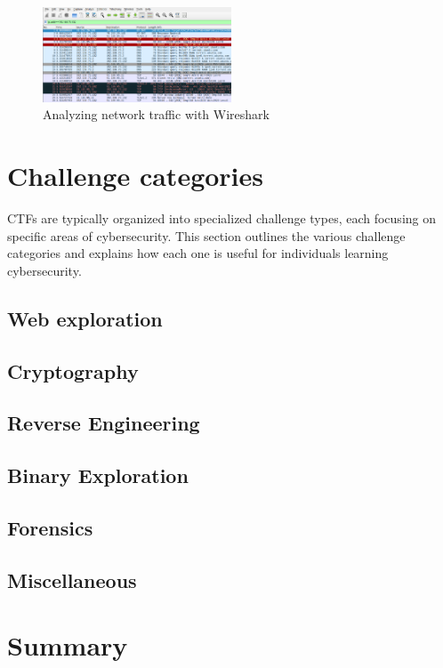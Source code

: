 \documentclass[conference]{IEEEtran}
\begin{document}
\begin{figure}[htbp]
	\centering
	\includegraphics[width=0.5\textwidth]{fig/wireshark.png}
	\caption{Analyzing network traffic with Wireshark}
	\label{fig-gdb}
\end{figure}

\section{Challenge categories}

CTFs are typically organized into specialized challenge types, each focusing on
specific areas of cybersecurity. This section outlines the various challenge
categories and explains how each one is useful for individuals learning
cybersecurity.

\subsection{Web exploration}

\subsection{Cryptography}

\subsection{Reverse Engineering}

\subsection{Binary Exploration}

\subsection{Forensics}

\subsection{Miscellaneous}

\section{Summary}
\end{document}
